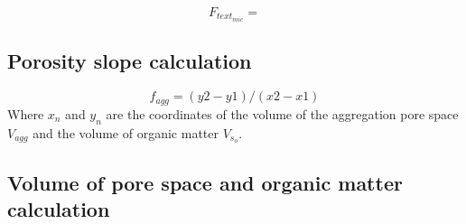 \documentclass[]{tufte-handout}
\begin{document}
\[F_{text_{mic}} = \]

\hypertarget{porosity-slope-calculation}{%
\subsection{Porosity slope
calculation}\label{porosity-slope-calculation}}

\[f_{agg} = (y2-y1)/(x2-x1)\] Where \(x_n\) and \(y_n\) are the
coordinates of the volume of the aggregation pore space \(V_{agg}\) and
the volume of organic matter \(V_{s_o}\).

\hypertarget{volume-of-pore-space-and-organic-matter-calculation}{%
\subsection{Volume of pore space and organic matter
calculation}\label{volume-of-pore-space-and-organic-matter-calculation}}
\end{document}
